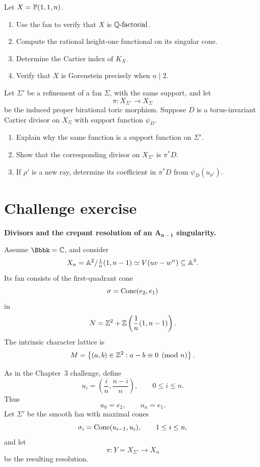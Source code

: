 \begin{exercises}
\item Let \(X=\mathbb{P}(1,1,n)\).
\begin{enumerate}[label=(\alph*),wide=0pt]
\item Use the fan to verify that \(X\) is \(\mathbb{Q}\text{-factorial}\).
\item Compute the rational height-one functional on its singular cone.
\item Determine the Cartier index of \(K_X\).
\item Verify that \(X\) is Gorenstein precisely when \(n\mid2\).
\end{enumerate}

\item Let \(\Sigma'\) be a refinement of a fan \(\Sigma\), with the
same support, and let
\[
\pi:X_{\Sigma'}\longrightarrow X_\Sigma
\]
be the induced proper birational toric morphism.
Suppose \(D\) is a torus-invariant Cartier divisor on \(X_\Sigma\)
with support function \(\psi_D\).
\begin{enumerate}[label=(\alph*),wide=0pt]
\item Explain why the same function is a support function on
\(\Sigma'\).
\item Show that the corresponding divisor on \(X_{\Sigma'}\) is
\(\pi^*D\).
\item If \(\rho'\) is a new ray, determine its coefficient in
\(\pi^*D\) from \(\psi_D(u_{\rho'})\).
\end{enumerate}

\end{exercises}

\clearpage
\section*{Challenge exercise}

\noindent
\textbf{Divisors and the crepant resolution of an
\(\boldsymbol{A_{n-1}}\) singularity.}

\medskip

Assume \(\Bbbk=\CC\), and consider
\[
X_n
=
\mathbb{A}^2/\tfrac1n(1,n-1)
\simeq
V(uv-w^n)\subseteq\mathbb{A}^3.
\]
Its fan consists of the first-quadrant cone
\[
\sigma=\operatorname{Cone}(e_2,e_1)
\]
in
\[
N
=
\mathbb{Z}^2+
\mathbb{Z}\left(\frac1n(1,n-1)\right).
\]
The intrinsic character lattice is
\[
M
=
\left\{
(a,b)\in\mathbb{Z}^2:
a-b\equiv0\pmod n
\right\}.
\]

As in the Chapter~3 challenge, define
\[
u_i
=
\left(\frac{i}{n},\frac{n-i}{n}\right),
\qquad
0\leq i\leq n.
\]
Thus
\[
u_0=e_2,
\qquad
u_n=e_1.
\]
Let \(\Sigma'\) be the smooth fan with maximal cones
\[
\sigma_i=\operatorname{Cone}(u_{i-1},u_i),
\qquad
1\leq i\leq n,
\]
and let
\[
\pi:Y=X_{\Sigma'}\longrightarrow X_n
\]
be the resulting resolution.

